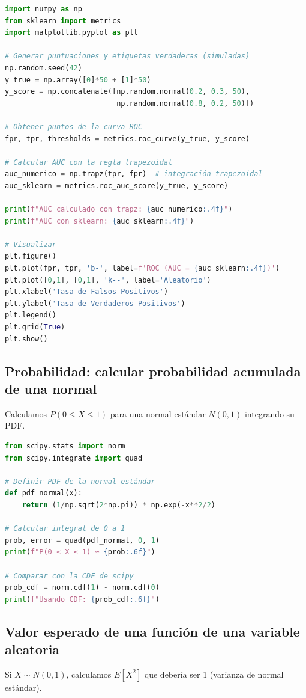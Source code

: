 \documentclass[12pt,a4paper,openany,oneside]{book}
\begin{document}
\begin{lstlisting}[language=Python]
import numpy as np
from sklearn import metrics
import matplotlib.pyplot as plt

# Generar puntuaciones y etiquetas verdaderas (simuladas)
np.random.seed(42)
y_true = np.array([0]*50 + [1]*50)
y_score = np.concatenate([np.random.normal(0.2, 0.3, 50),
                          np.random.normal(0.8, 0.2, 50)])

# Obtener puntos de la curva ROC
fpr, tpr, thresholds = metrics.roc_curve(y_true, y_score)

# Calcular AUC con la regla trapezoidal
auc_numerico = np.trapz(tpr, fpr)  # integración trapezoidal
auc_sklearn = metrics.roc_auc_score(y_true, y_score)

print(f"AUC calculado con trapz: {auc_numerico:.4f}")
print(f"AUC con sklearn: {auc_sklearn:.4f}")

# Visualizar
plt.figure()
plt.plot(fpr, tpr, 'b-', label=f'ROC (AUC = {auc_sklearn:.4f})')
plt.plot([0,1], [0,1], 'k--', label='Aleatorio')
plt.xlabel('Tasa de Falsos Positivos')
plt.ylabel('Tasa de Verdaderos Positivos')
plt.legend()
plt.grid(True)
plt.show()
\end{lstlisting}

\subsection{Probabilidad: calcular probabilidad acumulada de una normal}
Calculamos $P(0 \le X \le 1)$ para una normal estándar $N(0,1)$ integrando su PDF.

\begin{lstlisting}[language=Python]
from scipy.stats import norm
from scipy.integrate import quad

# Definir PDF de la normal estándar
def pdf_normal(x):
    return (1/np.sqrt(2*np.pi)) * np.exp(-x**2/2)

# Calcular integral de 0 a 1
prob, error = quad(pdf_normal, 0, 1)
print(f"P(0 ≤ X ≤ 1) ≈ {prob:.6f}")

# Comparar con la CDF de scipy
prob_cdf = norm.cdf(1) - norm.cdf(0)
print(f"Usando CDF: {prob_cdf:.6f}")
\end{lstlisting}

\subsection{Valor esperado de una función de una variable aleatoria}
Si $X \sim N(0,1)$, calculamos $E[X^2]$ que debería ser 1 (varianza de normal estándar).
\end{document}
